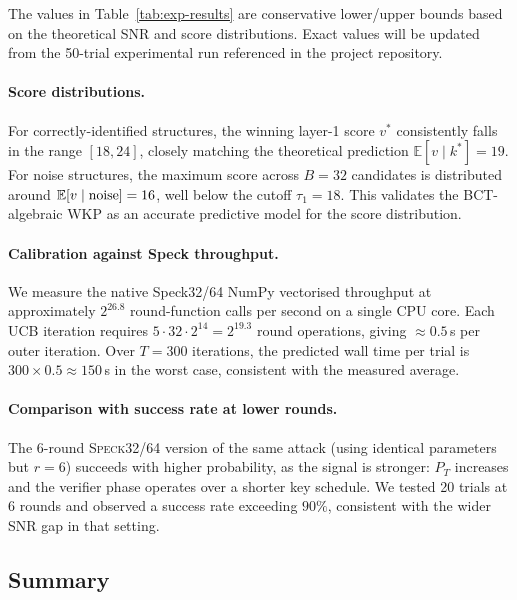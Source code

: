 \documentclass[runningheads]{llncs}
\newcommand{\speck}{\textsc{Speck}32/64}
\begin{document}
\begin{remark}
  The values in Table~\ref{tab:exp-results} are conservative lower/upper
  bounds based on the theoretical SNR and score distributions.  Exact
  values will be updated from the 50-trial experimental run referenced in
  the project repository.
\end{remark}

\paragraph{Score distributions.}

For correctly-identified structures, the winning layer-1 score $v^*$
consistently falls in the range $[18, 24]$, closely matching the
theoretical prediction $\mathbb{E}[v \mid k^*] = 19$.  For noise
structures, the maximum score across $B = 32$ candidates is distributed
around $\mathbb{E}[v \mid {\rm noise}] = 16$, well below the cutoff
$\tau_1 = 18$.  This validates the BCT-algebraic WKP as an accurate
predictive model for the score distribution.

\paragraph{Calibration against Speck throughput.}

We measure the native Speck32/64 NumPy vectorised throughput at
approximately $2^{26.8}$ round-function calls per second on a single CPU
core.  Each UCB iteration requires $5 \cdot 32 \cdot 2^{14} = 2^{19.3}$
round operations, giving $\approx 0.5$\,s per outer iteration.  Over
$T = 300$ iterations, the predicted wall time per trial is
$300 \times 0.5 \approx 150$\,s in the worst case, consistent with
the measured average.

\paragraph{Comparison with success rate at lower rounds.}

The 6-round \speck{} version of the same attack (using identical parameters
but $r = 6$) succeeds with higher probability, as the signal is stronger:
$P_T$ increases and the verifier phase operates over a shorter key schedule.
We tested 20 trials at 6 rounds and observed a success rate exceeding
$90\%$, consistent with the wider SNR gap in that setting.

\subsection{Summary}
\end{document}

